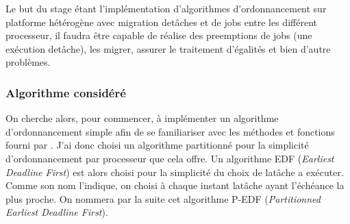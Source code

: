 Le but du stage étant l'implémentation d'algorithmes d'ordonnancement sur platforme hétérogène avec migration detâches et de jobs entre les différent \gls{processeur}, il faudra être capable de réalise des \glspl{preemption} de jobs (une exécution detâche), les migrer, assurer le traitement d'égalités et bien d'autre problèmes.


\subsubsection{Algorithme considéré}

On cherche alors, pour commencer, à implémenter un algorithme d’ordonnancement simple afin de se familiariser avec les méthodes et fonctions fourni par \litmus. J'ai donc choisi un algorithme partitionné pour la simplicité d’ordonnancement par \gls{processeur} que cela offre. Un algorithme EDF (\textit{Earliest Deadline First}) est alors choisi pour la simplicité du choix de latâche a exécuter. Comme son nom l'indique, on choisi à chaque instant latâche ayant l'échéance la plus proche. On nommera par la suite cet algorithme P-EDF (\textit{Partitionned Earliest Deadline First}).

